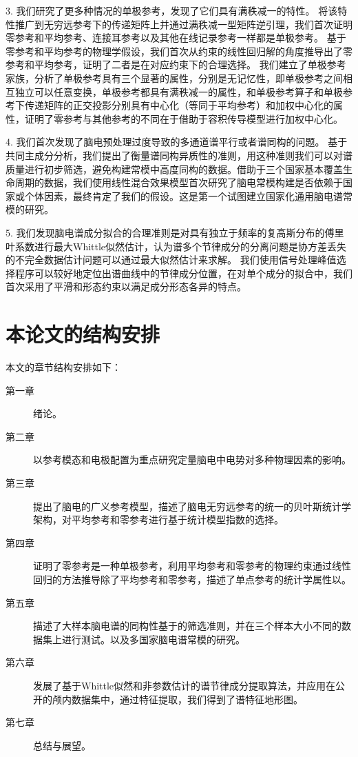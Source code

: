 3. 我们研究了更多种情况的单极参考，发现了它们具有满秩减一的特性。 将该特性推广到无穷远参考下的传递矩阵上并通过满秩减一型矩阵逆引理，我们首次证明零参考和平均参考、连接耳参考以及其他在线记录参考一样都是单极参考。 基于零参考和平均参考的物理学假设，我们首次从约束的线性回归解的角度推导出了零参考和平均参考，证明了二者是在对应约束下的合理选择。 我们建立了单极参考家族，分析了单极参考具有三个显著的属性，分别是无记忆性，即单极参考之间相互独立可以任意变换，单极参考都具有满秩减一的属性，和单极参考算子和单极参考下传递矩阵的正交投影分别具有中心化（等同于平均参考）和加权中心化的属性，证明了零参考与其他参考的不同在于借助于容积传导模型进行加权中心化。

4. 我们首次发现了脑电预处理过度导致的多通道谱平行或者谱同构的问题。 基于共同主成分分析，我们提出了衡量谱同构异质性的准则，用这种准则我们可以对谱质量进行初步筛选，避免构建常模中高度同构的数据。借助于三个国家基本覆盖生命周期的数据，我们使用线性混合效果模型首次研究了脑电常模构建是否依赖于国家或个体因素，最终肯定了我们的假设。这是第一个试图建立国家化通用脑电谱常模的研究。

5. 我们发现脑电谱成分拟合的合理准则是对具有独立于频率的复高斯分布的傅里叶系数进行最大Whittle似然估计，认为谱多个节律成分的分离问题是协方差丢失的不完全数据估计问题可以通过最大似然估计来求解。 我们使用信号处理峰值选择程序可以较好地定位出谱曲线中的节律成分位置，在对单个成分的拟合中，我们首次采用了平滑和形态约束以满足成分形态各异的特点。

\section{本论文的结构安排}
本文的章节结构安排如下：
\begin{description}
	\item[第一章] 绪论。
	\item[第二章] 以参考模态和电极配置为重点研究定量脑电中电势对多种物理因素的影响。
	\item[第三章] 提出了脑电的广义参考模型，描述了脑电无穷远参考的统一的贝叶斯统计学架构，对平均参考和零参考进行基于统计模型指数的选择。
	\item[第四章] 证明了零参考是一种单极参考，利用平均参考和零参考的物理约束通过线性回归的方法推导除了平均参考和零参考，描述了单点参考的统计学属性以。
	\item[第五章] 描述了大样本脑电谱的同构性基于的筛选准则，并在三个样本大小不同的数据集上进行测试。以及多国家脑电谱常模的研究。
    \item[第六章] 发展了基于Whittle似然和非参数估计的谱节律成分提取算法，并应用在公开的颅内数据集中，通过特征提取，我们得到了谱特征地形图。
	\item[第七章] 总结与展望。
\end{description}
